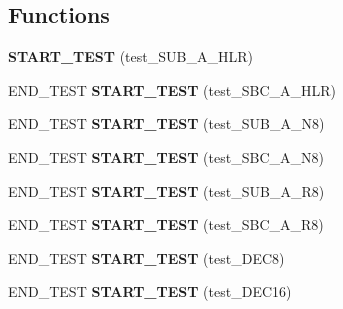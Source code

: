 \subsection*{Functions}
\begin{DoxyCompactItemize}
\item 
\mbox{\label{unit-test-cpu-dispatch_8c_ae89ae59cd0e8561450eb562f044dd0e6}} 
{\bfseries S\+T\+A\+R\+T\+\_\+\+T\+E\+ST} (test\+\_\+\+S\+U\+B\+\_\+\+A\+\_\+\+H\+LR)
\item 
\mbox{\label{unit-test-cpu-dispatch_8c_a7c7245a26c5396572805f8e3f079054a}} 
E\+N\+D\+\_\+\+T\+E\+ST {\bfseries S\+T\+A\+R\+T\+\_\+\+T\+E\+ST} (test\+\_\+\+S\+B\+C\+\_\+\+A\+\_\+\+H\+LR)
\item 
\mbox{\label{unit-test-cpu-dispatch_8c_a0dbdf11726e2208bb3990acb9ec08ef3}} 
E\+N\+D\+\_\+\+T\+E\+ST {\bfseries S\+T\+A\+R\+T\+\_\+\+T\+E\+ST} (test\+\_\+\+S\+U\+B\+\_\+\+A\+\_\+\+N8)
\item 
\mbox{\label{unit-test-cpu-dispatch_8c_aaba8905e046a19ff288b24a70a2b009a}} 
E\+N\+D\+\_\+\+T\+E\+ST {\bfseries S\+T\+A\+R\+T\+\_\+\+T\+E\+ST} (test\+\_\+\+S\+B\+C\+\_\+\+A\+\_\+\+N8)
\item 
\mbox{\label{unit-test-cpu-dispatch_8c_abc9e5a6f5b13e919384b7f847821e64d}} 
E\+N\+D\+\_\+\+T\+E\+ST {\bfseries S\+T\+A\+R\+T\+\_\+\+T\+E\+ST} (test\+\_\+\+S\+U\+B\+\_\+\+A\+\_\+\+R8)
\item 
\mbox{\label{unit-test-cpu-dispatch_8c_a2d21db06a8222bf8e12a2d69aef9aae1}} 
E\+N\+D\+\_\+\+T\+E\+ST {\bfseries S\+T\+A\+R\+T\+\_\+\+T\+E\+ST} (test\+\_\+\+S\+B\+C\+\_\+\+A\+\_\+\+R8)
\item 
\mbox{\label{unit-test-cpu-dispatch_8c_abef833667827024b3a66d3aaf7912783}} 
E\+N\+D\+\_\+\+T\+E\+ST {\bfseries S\+T\+A\+R\+T\+\_\+\+T\+E\+ST} (test\+\_\+\+D\+E\+C8)
\item 
\mbox{\label{unit-test-cpu-dispatch_8c_ac339e560a2cf20ea7250f41d7dc1265d}} 
E\+N\+D\+\_\+\+T\+E\+ST {\bfseries S\+T\+A\+R\+T\+\_\+\+T\+E\+ST} (test\+\_\+\+D\+E\+C16)

\end{DoxyCompactItemize}
